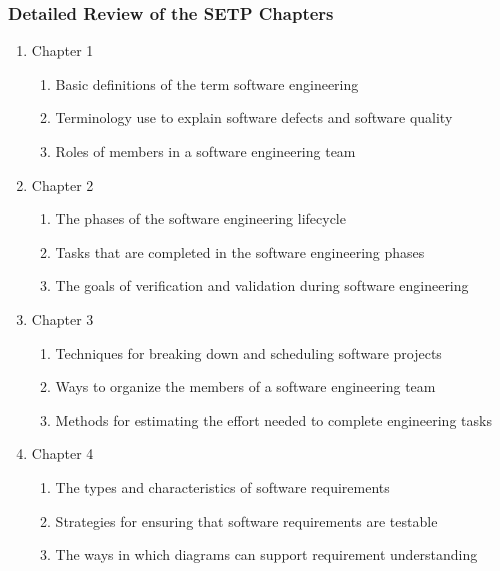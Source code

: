 \documentclass[11pt]{article}
\begin{document}
\subsubsection*{Detailed Review of the SETP Chapters}

\begin{enumerate}
  \itemsep 0in

  \item Chapter 1

    \vspace*{-.5em}

    \begin{enumerate}
      \itemsep 0in
      \item Basic definitions of the term software engineering
      \item Terminology use to explain software defects and software quality
      \item Roles of members in a software engineering team
    \end{enumerate}

  \item Chapter 2

    \vspace*{-.5em}

    \begin{enumerate}
      \itemsep 0in
      \item The phases of the software engineering lifecycle
      \item Tasks that are completed in the software engineering phases
      \item The goals of verification and validation during software engineering
    \end{enumerate}

  \item Chapter 3

    \begin{enumerate}
      \itemsep 0in
      \item Techniques for breaking down and scheduling software projects
      \item Ways to organize the members of a software engineering team
      \item Methods for estimating the effort needed to complete engineering
        tasks
    \end{enumerate}

  \item Chapter 4

    \begin{enumerate}
      \itemsep 0in
      \item The types and characteristics of software requirements
      \item Strategies for ensuring that software requirements are testable
      \item The ways in which diagrams can support requirement understanding
    \end{enumerate}


\end{enumerate}
\end{document}
